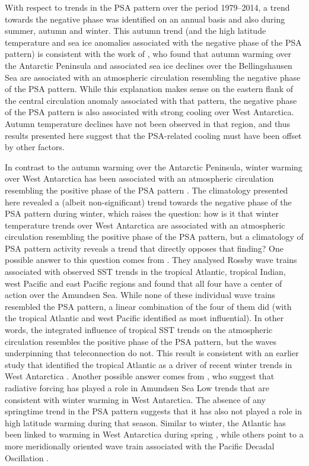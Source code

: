 With respect to trends in the PSA pattern over the period 1979--2014, a trend towards the negative phase was identified on an annual basis and also during summer, autumn and winter. This autumn trend (and the high latitude temperature and sea ice anomalies associated with the negative phase of the PSA pattern) is consistent with the work of \citet{Ding2013}, who found that autumn warming over the Antarctic Peninsula and associated sea ice declines over the Bellingshausen Sea are associated with an atmospheric circulation resembling the negative phase of the PSA pattern. While this explanation makes sense on the eastern flank of the central circulation anomaly associated with that pattern, the negative phase of the PSA pattern is also associated with strong cooling over West Antarctica. Autumn temperature declines have not been observed in that region, and thus results presented here suggest that the PSA-related cooling must have been offset by other factors. 

In contrast to the autumn warming over the Antarctic Peninsula, winter warming over West Antarctica has been associated with an atmospheric circulation resembling the positive phase of the PSA pattern \citep{Ding2011}. The climatology presented here revealed a (albeit non-significant) trend towards the negative phase of the PSA pattern during winter, which raises the question: how is it that winter temperature trends over West Antarctica are associated with an atmospheric circulation resembling the positive phase of the PSA pattern, but a climatology of PSA pattern activity reveals a trend that directly opposes that finding? One possible answer to this question comes from \citet{Li2015a}. They analysed Rossby wave trains associated with observed SST trends in the tropical Atlantic, tropical Indian, west Pacific and east Pacific regions and found that all four have a center of action over the Amundsen Sea. While none of these individual wave trains resembled the PSA pattern, a linear combination of the four of them did (with the tropical Atlantic and west Pacific identified as most influential). In other words, the integrated influence of tropical SST trends on the atmospheric circulation resembles the positive phase of the PSA pattern, but the waves underpinning that teleconnection do not. This result is consistent with an earlier study that identified the tropical Atlantic as a driver of recent winter trends in West Antarctica \citep{Li2014}. Another possible answer comes from \citet{Fogt2015}, who suggest that radiative forcing has played a role in Amundsen Sea Low trends that are consistent with winter warming in West Antarctica. The absence of any springtime trend in the PSA pattern suggests that it has also not played a role in high latitude warming during that season. Similar to winter, the Atlantic has been linked to warming in West Antarctica during spring \citep{Simpkins2014}, while others point to a more meridionally oriented wave train associated with the Pacific Decadal Oscillation \citep[PDO;][]{Clem2015,Clem2015a}. 

